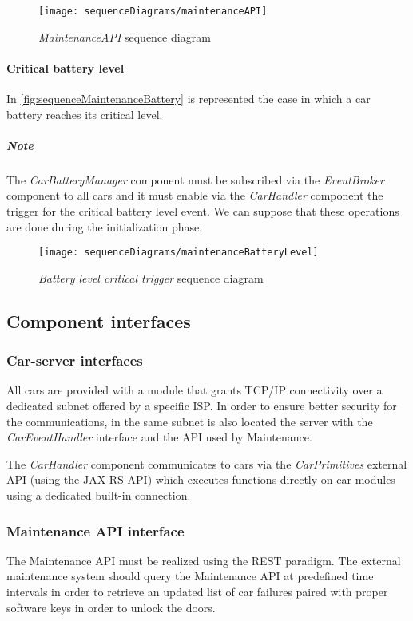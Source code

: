 \begin{figure}[h!]
	\centering
	\texttt{[image: sequenceDiagrams/maintenanceAPI]}
	\caption{
		\label{fig:sequenceMaintenanceAPI} 
		\emph{MaintenanceAPI} sequence diagram
	}
\end{figure}

\clearpage
\paragraph{Critical battery level}In \autoref{fig:sequenceMaintenanceBattery} is represented the case in which a car battery reaches its critical level.
\subparagraph{Note} The \emph{CarBatteryManager} component must be subscribed via the \mbox{\emph{EventBroker}} component to all cars and it must enable via the \emph{CarHandler} component the trigger for the critical battery level event. We can suppose that these operations are done during the initialization phase.
\begin{figure}[h!]
	\centering
	\texttt{[image: sequenceDiagrams/maintenanceBatteryLevel]}
	\caption{
		\label{fig:sequenceMaintenanceBattery} 
		\emph{Battery level critical trigger} sequence diagram
	}
\end{figure}

\clearpage
\subsection{Component interfaces}

\subsubsection{Car-server interfaces}
All cars are provided with a module that grants TCP/IP connectivity over a dedicated subnet offered by a specific ISP. In order to ensure better security for the communications, in the same subnet is also located the server with the \mbox{\emph{CarEventHandler}} interface and the API used by Maintenance.

The \emph{CarHandler} component communicates to cars via the \mbox{\emph{CarPrimitives}} external API (using the JAX-RS API) which executes functions directly on car modules using a dedicated built-in connection.

\subsubsection{Maintenance API interface}
The Maintenance API must be realized using the REST paradigm. The external maintenance system should query the Maintenance API at predefined time intervals in order to retrieve an updated list of car failures paired with proper software keys in order to unlock the doors.

